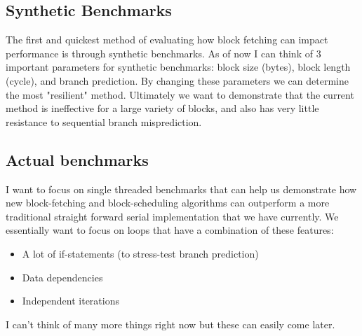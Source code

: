 \subsection{Synthetic Benchmarks}

The first and quickest method of evaluating how block fetching can impact performance is through synthetic benchmarks.
As of now I can think of 3 important parameters for synthetic benchmarks: block size (bytes), block length (cycle), and branch prediction.
By changing these parameters we can determine the most "resilient" method.
Ultimately we want to demonstrate that the current method is ineffective for a large variety of blocks, and also has very little resistance to sequential branch misprediction.

\subsection{Actual benchmarks}

I want to focus on single threaded benchmarks that can help us demonstrate how new block-fetching and block-scheduling algorithms can outperform a more traditional straight forward serial implementation that we have currently.
We essentially want to focus on loops that have a combination of these features:
\begin{itemize}
\item A lot of if-statements (to stress-test branch prediction)
\item Data dependencies
\item Independent iterations
\end{itemize}
I can't think of many more things right now but these can easily come later.